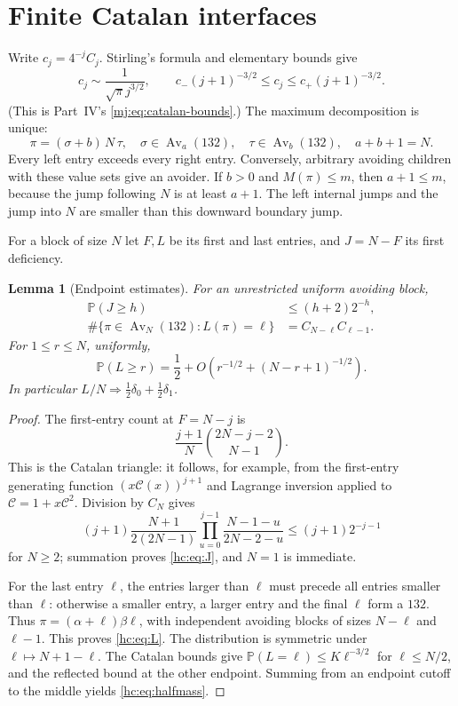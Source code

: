 \documentclass[11pt,a4paper]{article}
\newtheorem{lemma}[lemma]{Lemma}
\theoremstyle{definition}\newaliascnt{definition}{theorem}
\theoremstyle{remark}\newaliascnt{remark}{theorem}
\newcommand{\Av}{\operatorname{Av}}
\newcommand{\Cat}{\mathcal C}
\newcommand{\ljP}{\mathbb P}
\begin{document}
\section{Finite Catalan interfaces}
\label{hc:sec:interfaces}
Write $c_j=4^{-j}C_j$. Stirling's formula and elementary bounds give
\begin{equation}\label{hc:eq:cat}
 c_j\sim\frac1{\sqrt\pi j^{3/2}},\qquad
 c_-(j+1)^{-3/2}\le c_j\le c_+(j+1)^{-3/2}.
\end{equation}
(This is Part~IV's \eqref{mj:eq:catalan-bounds}.) The maximum
decomposition is unique:
\[
 \pi=(\sigma+b)\,N\,\tau,\quad
 \sigma\in\Av_a(132),\quad\tau\in\Av_b(132),\quad a+b+1=N.
\]
Every left entry exceeds every right entry. Conversely, arbitrary avoiding
children with these value sets give an avoider. If $b>0$ and $M(\pi)\le m$,
then $a+1\le m$, because the jump following $N$ is at least $a+1$. The left
internal jumps and the jump into $N$ are smaller than this downward boundary
jump.

For a block of size $N$ let $F,L$ be its first and last entries, and $J=N-F$
its first deficiency.
\begin{lemma}[Endpoint estimates]\label{hc:lem:endpoints}
For an unrestricted uniform avoiding block,
\begin{align}
 \ljP(J\ge h)&\le(h+2)2^{-h},\label{hc:eq:J}\\
 \#\{\pi\in\Av_N(132):L(\pi)=\ell\}&=C_{N-\ell}C_{\ell-1}.
 \label{hc:eq:L}
\end{align}
For $1\le r\le N$, uniformly,
\begin{equation}\label{hc:eq:halfmass}
 \ljP(L\ge r)=\frac12+
 O\!\left(r^{-1/2}+(N-r+1)^{-1/2}\right).
\end{equation}
In particular $L/N\Rightarrow\tfrac12\delta_0+\tfrac12\delta_1$.
\end{lemma}
\begin{proof}
The first-entry count at $F=N-j$ is
\[
 \frac{j+1}{N}\binom{2N-j-2}{N-1}.
\]
This is the Catalan triangle: it follows, for example, from the first-entry
generating function $(x\Cat(x))^{j+1}$ and Lagrange inversion applied to
$\Cat=1+x\Cat^2$. Division by $C_N$ gives
\[
 (j+1)\frac{N+1}{2(2N-1)}
 \prod_{u=0}^{j-1}\frac{N-1-u}{2N-2-u}
 \le(j+1)2^{-j-1}
\]
for $N\ge2$; summation proves \eqref{hc:eq:J}, and $N=1$ is immediate.

For the last entry $\ell$, the entries larger than $\ell$ must precede all
entries smaller than $\ell$: otherwise a smaller entry, a larger entry and
the final $\ell$ form a $132$. Thus $\pi=(\alpha+\ell)\beta\ell$, with
independent avoiding blocks of sizes $N-\ell$ and $\ell-1$. This proves
\eqref{hc:eq:L}. The distribution is symmetric under $\ell\mapsto N+1-\ell$.
The Catalan bounds give $\ljP(L=\ell)\le K\ell^{-3/2}$ for $\ell\le N/2$, and
the reflected bound at the other endpoint. Summing from an endpoint cutoff
to the middle yields \eqref{hc:eq:halfmass}.
\end{proof}
\end{document}
